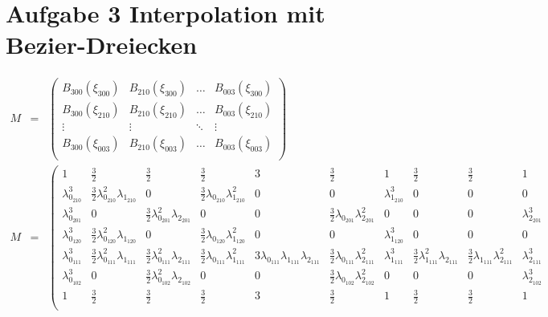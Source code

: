 
\section*{Aufgabe 3 Interpolation mit Bezier-Dreiecken}
\tiny
\begin{sideways}
    \parbox{\textheight}{
\begin{eqnarray}
    M &=&    
\left(\begin{matrix}
    B_{300}(\xi_{300}) &B_{210}(\xi_{300})& \dots  &B_{003}(\xi_{300})  \\
    B_{300}(\xi_{210}) &B_{210}(\xi_{210})& \dots  &B_{003}(\xi_{210})  \\
    \vdots & \vdots &\ddots & \vdots \\
    B_{300}(\xi_{003}) &B_{210}(\xi_{003})& \dots  &B_{003}(\xi_{003})  \\
\end{matrix}\right) \\
    M &=&
\left(\begin{matrix}
1 & \frac{3}{2} & \frac{3}{2} &\frac{3}{2} & 3 & \frac{3}{2} & 1 & \frac{3}{2} &\frac{3}{2} & 1  \\
\lambda_{0_{210}}^3 & \frac{3}{2} \lambda_{0_{210}}^2 \lambda_{1_{210}} & 0 & \frac{3}{2} \lambda_{0_{210}} \lambda_{1_{210}}^2 & 0 & 0 & \lambda_{1_{210}}^3 & 0 &0 & 0  \\
\lambda_{0_{201}}^3 & 0 & \frac{3}{2}\lambda_{0_{201}}^2 \lambda_{2_{201}} & 0 & 0 & \frac{3}{2} \lambda_{0_{201}} \lambda_{2_{201}}^2& 0 & 0 &0 & \lambda_{2_{201}}^3  \\
\lambda_{0_{120}}^3 & \frac{3}{2} \lambda_{0_{120}}^2 \lambda_{1_{120}} & 0 & \frac{3}{2} \lambda_{0_{120}} \lambda_{1_{120}}^2 & 0 & 0 & \lambda_{1_{120}}^3 & 0 &0 & 0  \\
\lambda_{0_{111}}^3 & \frac{3}{2} \lambda_{0_{111}}^2 \lambda_{1_{111}} & \frac{3}{2}\lambda_{0_{111}}^2 \lambda_{2_{111}} & \frac{3}{2} \lambda_{0_{111}} \lambda_{1_{111}}^2 & 3 \lambda_{0_{111}}\lambda_{1_{111}}\lambda_{2_{111}} & \frac{3}{2} \lambda_{0_{111}} \lambda_{2_{111}}^2& \lambda_{1_{111}}^3 & \frac{3}{2} \lambda_{1_{111}}^2 \lambda_{2_{111}} &\frac{3}{2} \lambda_{1_{111}}\lambda_{2_{111}}^2 & \lambda_{2_{111}}^3  \\
\lambda_{0_{102}}^3 & 0 & \frac{3}{2}\lambda_{0_{102}}^2 \lambda_{2_{102}} & 0 & 0 & \frac{3}{2} \lambda_{0_{102}} \lambda_{2_{102}}^2& 0 & 0 &0 & \lambda_{2_{102}}^3  \\
1 & \frac{3}{2} & \frac{3}{2} &\frac{3}{2} & 3 & \frac{3}{2} & 1 & \frac{3}{2} &\frac{3}{2} & 1  \\

\end{matrix}
\end{eqnarray}}
\end{sideways}
